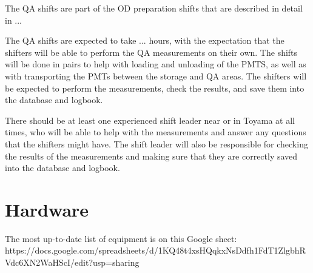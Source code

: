 \documentclass[12pt,a4paper]{article}
\begin{document}
The QA shifts are part of the OD preparation shifts that are described in detail in ... 

The QA shifts are expected to take ... hours, with the expectation that the shifters will be able to perform the QA measurements on their own. The shifts will be done in pairs to help with loading and unloading of the PMTS, as well as with transporting the PMTs between the storage and QA areas. The shifters will be expected to perform the measurements, check the results, and save them into the database and logbook.

There should be at least one experienced shift leader near or in Toyama at all times, who will be able to help with the measurements and answer any questions that the shifters might have. The shift leader will also be responsible for checking the results of the measurements and making sure that they are correctly saved into the database and logbook.



\section{Hardware}
The most up-to-date list of equipment is on this Google sheet: https://docs.google.com/spreadsheets/d/1KQ48t4xsHQqkxNsDdfh1FdT1ZlgbhRVdc6XN2WaHScI/edit?usp=sharing 
\end{document}
